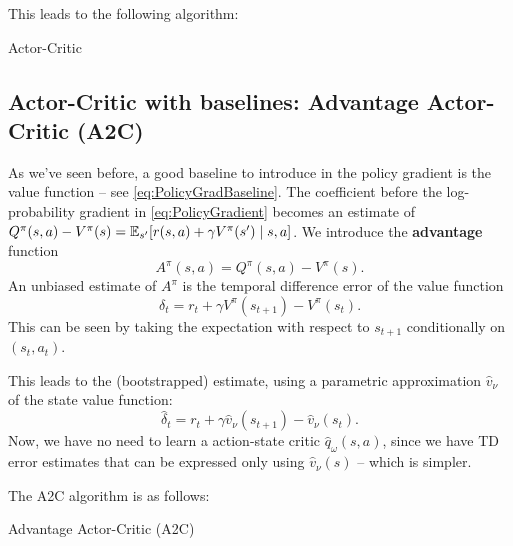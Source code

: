 \documentclass[../course-notes.tex]{subfiles}
\begin{document}
This leads to the following algorithm:

\begin{algorithm}[H]
	\caption{Actor-Critic}\label{algo:BaseActorCritic}
\end{algorithm}



\subsection{Actor-Critic with baselines: Advantage Actor-Critic (A2C)}

As we've seen before, a good baseline to introduce in the policy gradient is the value function -- see \cref{eq:PolicyGradBaseline}.
The coefficient before the log-probability gradient in \eqref{eq:PolicyGradient} becomes an estimate of $Q^\pi(s,a) - V^\pi(s) = \operatorname{\mathbb{E}}_{s'}[r(s,a) + \gamma V^\pi(s')\mid s,a]$. We introduce the \textbf{advantage} function
\begin{equation}\label{eq:AdvantageDefn}
A^\pi(s,a) = Q^\pi(s,a) - V^\pi(s).
\end{equation}
An unbiased estimate of $A^\pi$ is the temporal difference error of the value function
\[
\delta_t = r_t + \gamma V^\pi(s_{t+1}) - V^\pi(s_t).
\]
This can be seen by taking the expectation with respect to $s_{t+1}$ conditionally on $(s_t,a_t)$.

This leads to the (bootstrapped) estimate, using a parametric approximation $\widehat{v}_\nu$ of the state value function:
\[
\widehat{\delta}_t = r_t + \gamma\widehat{v}_\nu(s_{t+1}) - \widehat{v}_\nu(s_t).
\]
Now, we have no need to learn a action-state critic $\widehat{q}_\omega(s,a)$, since we have TD error estimates that can be expressed only using $\widehat{v}_\nu(s)$ -- which is simpler.

The A2C algorithm is as follows:

\begin{algorithm}[H]
	\caption{Advantage Actor-Critic (A2C)}\label{algo:AdvantageActorCritic}
\end{algorithm}
\end{document}
